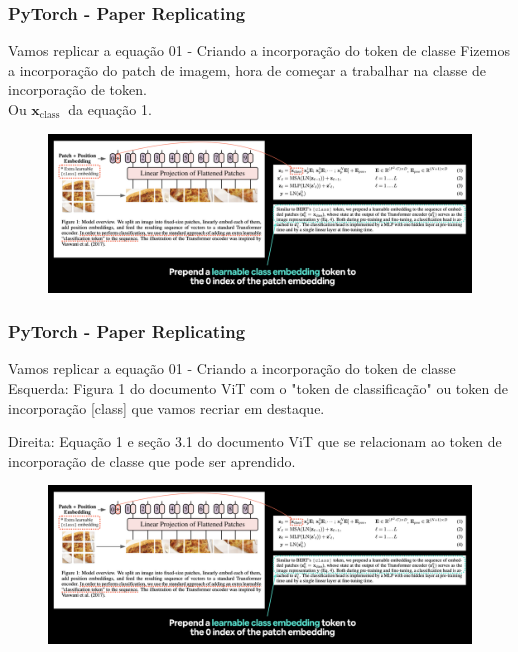 \documentclass{beamer}
\begin{document}
\begin{frame}
	\frametitle{PyTorch - Paper Replicating}
	\begin{block}{Vamos replicar a equação 01 - Criando a incorporação do token de classe}
		Fizemos a incorporação do patch de imagem, hora de começar a trabalhar na classe de incorporação de token. \\
		Ou $\mathbf{x}_\text {class }$ da equação 1.
	\begin{figure}
		\centering
		\includegraphics[width=1\linewidth]{figures/class_token}
	\end{figure}
			
		
	\end{block}
\end{frame}

\begin{frame}
	\frametitle{PyTorch - Paper Replicating}
	\begin{block}{Vamos replicar a equação 01 - Criando a incorporação do token de classe}
		Esquerda: Figura 1 do documento ViT com o "token de classificação" ou token de incorporação [class] que vamos recriar em destaque.
		
		Direita: Equação 1 e seção 3.1 do documento ViT que se relacionam ao token de incorporação de classe que pode ser aprendido.
		\begin{figure}
			\centering
			\includegraphics[width=1\linewidth]{figures/class_token}
		\end{figure}
		
		
	\end{block}
\end{frame}
\end{document}

